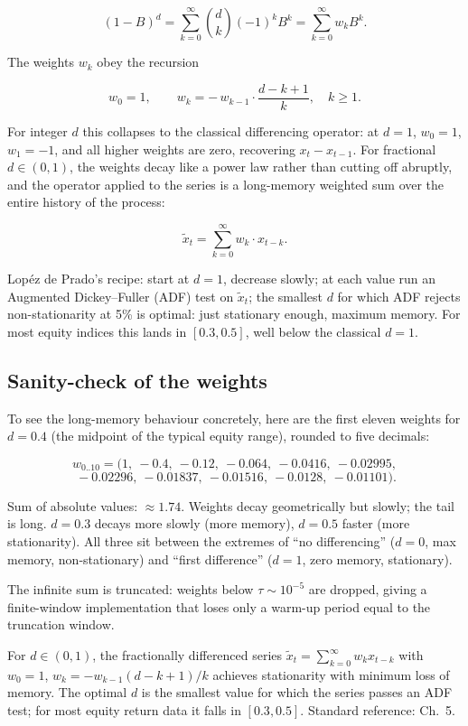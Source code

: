 \[
(1 - B)^d = \sum_{k=0}^{\infty} \binom{d}{k} (-1)^k B^k
  = \sum_{k=0}^{\infty} w_k B^k.
\]

The weights $w_k$ obey the recursion

\[
w_0 = 1, \qquad
w_k = -\,w_{k-1} \cdot \frac{d - k + 1}{k}, \quad k \ge 1.
\]

For integer $d$ this collapses to the classical differencing
operator: at $d = 1$, $w_0 = 1$, $w_1 = -1$, and all higher
weights are zero, recovering $x_t - x_{t-1}$. For fractional
$d \in (0, 1)$, the weights decay like a power law rather than
cutting off abruptly, and the operator applied to the series is
a long-memory weighted sum over the entire history of the
process:

\[
\tilde x_t = \sum_{k=0}^{\infty} w_k \cdot x_{t-k}.
\]

Lop\'ez de Prado's recipe: start at $d = 1$, decrease slowly; at
each value run an Augmented Dickey--Fuller (ADF) test on $\tilde
x_t$; the smallest $d$ for which ADF rejects non-stationarity at
5\% is optimal: just stationary enough, maximum memory. For
most equity indices this lands in $[0.3, 0.5]$, well below the
classical $d = 1$.

\subsection{Sanity-check of the weights}
\label{subsec:ml_fracdiff_numbers}

To see the long-memory behaviour concretely, here are the first
eleven weights for $d = 0.4$ (the midpoint of the typical equity
range), rounded to five decimals:

\[
w_{0..10} = (1,\ -0.4,\ -0.12,\ -0.064,\ -0.0416,\ -0.02995,
\]\[
\ -0.02296,\ -0.01837,\ -0.01516,\ -0.0128,\ -0.01101).
\]

Sum of absolute values: $\approx 1.74$. Weights decay geometrically
but slowly; the tail is long. $d = 0.3$ decays more slowly (more
memory), $d = 0.5$ faster (more stationarity). All three sit
between the extremes of ``no differencing'' ($d = 0$, max memory,
non-stationary) and ``first difference'' ($d = 1$, zero memory,
stationary).

The infinite sum is truncated: weights below $\tau \sim 10^{-5}$
are dropped, giving a finite-window implementation that loses only
a warm-up period equal to the truncation window.

\begin{keyfactbox}
For $d \in (0, 1)$, the fractionally differenced series
$\tilde x_t = \sum_{k=0}^{\infty} w_k x_{t-k}$ with
$w_0 = 1$, $w_k = -w_{k-1}(d - k + 1)/k$ achieves stationarity
with minimum loss of memory. The optimal $d$ is the smallest
value for which the series passes an ADF test; for most equity
return data it falls in $[0.3, 0.5]$. Standard reference:
\citeAFML{} Ch.~5.
\end{keyfactbox}

